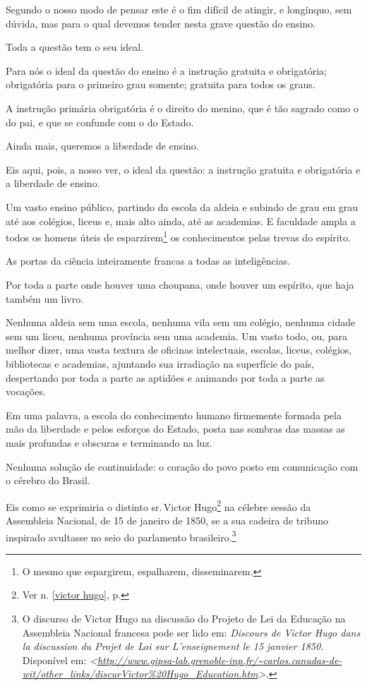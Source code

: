 Segundo o nosso modo de pensar este é o fim difícil de atingir, e
longínquo, sem dúvida, mas para o qual devemos tender nesta grave
questão do ensino.

Toda a questão tem o seu ideal.

Para nós o ideal da questão do ensino é a instrução gratuita e
obrigatória; obrigatória para o primeiro grau somente; gratuita para
todos os graus.

A instrução primária obrigatória é o direito do menino, que é tão
sagrado como o do pai, e que se confunde com o do Estado.

Ainda mais, queremos a liberdade de ensino.

Eis aqui, pois, a nosso ver, o ideal da questão: a instrução gratuita e
obrigatória e a liberdade de ensino.

Um vasto ensino público, partindo da escola da aldeia e subindo de grau
em grau até aos colégios, liceus e, mais alto ainda, até as academias. E
faculdade ampla a todos os homens úteis de esparzirem\footnote{O mesmo
  que espargirem, espalharem, disseminarem.} os conhecimentos pelas
trevas do espírito.

As portas da ciência inteiramente francas a todas as inteligências.

Por toda a parte onde houver uma choupana, onde houver um espírito, que
haja também um livro.

Nenhuma aldeia sem uma escola, nenhuma vila sem um colégio, nenhuma
cidade sem um liceu, nenhuma província sem uma academia. Um vasto todo,
ou, para melhor dizer, uma vasta textura de oficinas intelectuais,
escolas, liceus, colégios, bibliotecas e academias, ajuntando sua
irradiação na superfície do país, despertando por toda a parte as
aptidões e animando por toda a parte as vocações.

Em uma palavra, a escola do conhecimento humano firmemente formada pela
mão da liberdade e pelos esforços do Estado, posta nas sombras das
massas as mais profundas e obscuras e terminando na luz.

Nenhuma solução de continuidade: o coração do povo posto em comunicação
com o cérebro do Brasil.

Eis como se exprimiria o distinto sr.\,Victor Hugo\footnote{Ver n. \ref{victor hugo}, p. \pageref{victor hugo}} 
na célebre sessão da Assembleia Nacional, de 15 de janeiro de 1850, se a
sua cadeira de tribuno inspirado avultasse no seio do parlamento
brasileiro.\footnote{O discurso de Victor Hugo na discussão do Projeto
  de Lei da Educação na Assembleia Nacional francesa pode ser lido em:
  \emph{Discours de Victor Hugo dans la discussion du Projet de Loi sur
  L'enseignement le 15 janvier 1850.} Disponível em:
  \emph{\textless{}\url{http://www.gipsa-lab.grenoble-inp.fr/~carlos.canudas-de-wit/other_links/discurVictor\%20Hugo_Education.htm}\textgreater.}}

